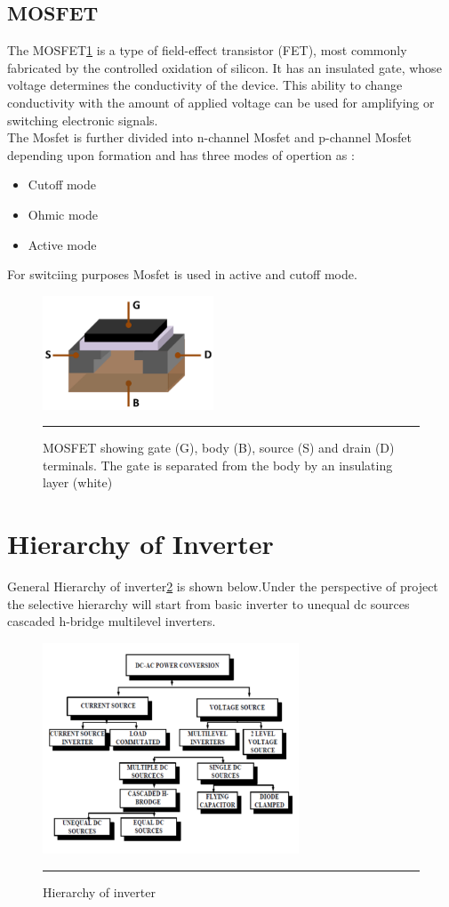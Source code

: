 \subsection{MOSFET}
The MOSFET\ref{fig:2} is a type of field-effect transistor (FET), most commonly fabricated by the controlled oxidation of silicon. It has an insulated gate, whose voltage determines the conductivity of the device. This ability to change conductivity with the amount of applied voltage can be used for amplifying or switching electronic signals.\\
The Mosfet is further divided into n-channel Mosfet and p-channel Mosfet depending upon formation and has three modes of opertion as :
\begin{itemize}
\item Cutoff mode
\item Ohmic mode
\item Active mode
\end{itemize}
For switciing purposes Mosfet is used in active and cutoff mode.
  \begin{figure}[htbp]
	\centering
		\includegraphics[width = 2in]{./Figures/Mosfet.pdf}
		\rule{35em}{5pt}
	\caption{ MOSFET showing gate (G), body (B), source (S) and drain (D) terminals. The gate is separated from the body by an insulating layer (white)}
	\label{fig:2}
\end{figure}
\section{Hierarchy of Inverter}
General Hierarchy of inverter\ref{fig:3} is shown below.Under the perspective of project the selective hierarchy will start from basic inverter to unequal dc sources cascaded h-bridge multilevel inverters.   
\begin{figure}[htbp]
	\centering
		\includegraphics[width = 3in]{./Figures/Picture2.pdf}
		\rule{35em}{5pt}
	\caption{Hierarchy of inverter}
	\label{fig:3}
\end{figure}
